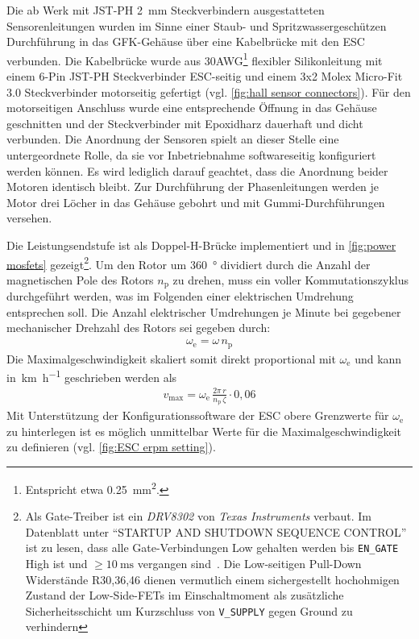 	Die ab Werk mit JST-PH \qty{2}{\milli\metre} Steckverbindern ausgestatteten Sensorenleitungen wurden im Sinne einer Staub- und Spritzwassergeschützen Durchführung in das GFK-Gehäuse über eine Kabelbrücke mit den ESC verbunden.
	Die Kabelbrücke wurde aus 30AWG\footnote{\hspace{1mm}Entspricht etwa \qty{0,25}{\milli\metre\squared}.} flexibler Silikonleitung mit einem 6-Pin JST-PH Steckverbinder ESC-seitig und einem 3x2 Molex Micro-Fit 3.0 Steckverbinder motorseitig gefertigt (vgl. \cref{fig:hall sensor connectors}).
	Für den motorseitigen Anschluss wurde eine entsprechende Öffnung in das Gehäuse geschnitten und der Steckverbinder mit Epoxidharz dauerhaft und dicht verbunden.
	Die Anordnung der Sensoren spielt an dieser Stelle eine untergeordnete Rolle, da sie vor Inbetriebnahme softwareseitig konfiguriert werden können.
	Es wird lediglich darauf geachtet, dass die Anordnung beider Motoren identisch bleibt.
	Zur Durchführung der Phasenleitungen werden je Motor drei Löcher in das Gehäuse gebohrt und mit Gummi-Durchführungen versehen.\par\medskip
	Die Leistungsendstufe ist als Doppel-H-Brücke implementiert und in \cref{fig:power mosfets} gezeigt\footnote{\hspace{1mm}Als Gate-Treiber ist ein \textit{DRV8302} von \textit{Texas Instruments} verbaut. Im Datenblatt unter ``STARTUP AND SHUTDOWN SEQUENCE CONTROL'' ist zu lesen, dass alle Gate-Verbindungen Low gehalten werden bis \texttt{EN\_GATE} High ist und \(\geq \qty{10}{\milli\second}\) vergangen sind~\cite{drv8302.datasheet}. Die Low-seitigen Pull-Down Widerstände R30,36,46 dienen vermutlich einem sichergestellt hochohmigen Zustand der Low-Side-FETs im Einschaltmoment als zusätzliche Sicherheitsschicht um Kurzschluss von \texttt{V\_SUPPLY} gegen Ground zu verhindern}.
	Um den Rotor um \qty{360}{\degree} dividiert durch die Anzahl der magnetischen Pole des Rotors \(n_\text{p}\) zu drehen, muss ein voller Kommutationszyklus durchgeführt werden, was im Folgenden einer elektrischen Umdrehung entsprechen soll.
	Die Anzahl elektrischer Umdrehungen je Minute bei gegebener mechanischer Drehzahl des Rotors sei gegeben durch:
	\begin{align}
		\omega_\text{e} = \omega \, n_\text{p}
		\label{eq:ERPM and RPM}
	\end{align}
	Die Maximalgeschwindigkeit skaliert somit direkt proportional mit \(\omega_\text{e}\) und kann in~\unit{\kilo\metre\per\hour} geschrieben werden als
	\begin{align}
		v_\text{max} = \omega_\text{e} \, \frac{2\pi \, r}{n_\text{p} \, \zeta} \cdot 0,06
		\label{eq:max speed by ERPM}
	\end{align}
	Mit Unterstützung der Konfigurationssoftware der ESC obere Grenzwerte für \(\omega_\text{e}\) zu hinterlegen ist es möglich unmittelbar Werte für die Maximalgeschwindigkeit zu definieren (vgl. \cref{fig:ESC erpm setting}).